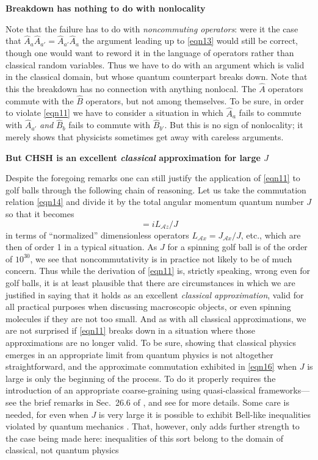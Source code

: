 \documentclass[10pt]{article} %
\def\outl#1{\par{\medskip\noindent\hspace*{.5cm}\bf
      \mathversion{bold}#1\mathversion{normal}\smallskip} }
\def\np{} \def\xa{} \def\xb{} \def\xn{} \def\xp{}
\def\outl#1{} \def\np{} \def\xa{} \def\xb{} \def\xn{} \def\xp{}
\def\outl#1{\par{\medskip\noindent\hspace*{.5cm}\bf
      \mathversion{bold}#1\mathversion{normal}\smallskip} }
\def\np{\newpage }\def\xn{\nopagebreak }\def\xp{\pagebreak }
\newcommand{\AM}{{\mathcal A}}
\begin{document}
\xb
\outl{Breakdown has nothing to do with nonlocality}
\xa


Note that the failure has to do with \emph{noncommuting operators}: were it
the case that $\hat A_a\hat A_{a'} =\hat A_{a'} \hat A_a$ the argument leading
up to \eqref{eqn13} would still be correct, though one would want to reword it
in the language of operators rather than classical random variables.  Thus we
have to do with an argument which is valid in the classical domain, but whose
quantum counterpart breaks down.  Note that this the breakdown has no
connection with anything nonlocal.  The $\hat A$ operators commute
with the $\hat B$ operators, but not among themselves.  To be sure, in order
to violate \eqref{eqn11} we have to consider a situation in which $\hat A_a$
fails to commute with $\hat A_{a'}$ \emph{and} $\hat B_b$ fails to commute
with $\hat B_{b'}$.  But this is no sign of nonlocality; it merely shows that
physicists sometimes get away with careless arguments.

\xb
\outl{But CHSH is an excellent \emph{classical} approximation for large $J$}
\xa


Despite the foregoing remarks one can still justify the application of
\eqref{eqn11} to golf balls through the following chain of reasoning. 
Let us take the commutation relation \eqref{eqn14}
and divide it by the total angular momentum
quantum number $J$ so that it becomes
\begin{equation}
  [L_{\AM x},L_{\AM y}] = i L_{\AM z}/J
\label{eqn16}
\end{equation}
in terms of ``normalized'' dimensionless operators $L_{\AM x}=J_{\AM x}/J$,
etc., which are then of order 1 in a typical situation.  As $J$ for a spinning
golf ball is of the order of $10^{30}$, we see that noncommutativity is in
practice not likely to be of much concern. Thus while the derivation of
\eqref{eqn11} is, strictly speaking, wrong even for golf balls, it is at least
plausible that there are circumstances in which we are justified in saying
that it holds as an excellent \emph{classical approximation}, valid for all
practical purposes when discussing macroscopic objects, or even spinning
molecules if they are not too small.  And as with all classical
approximations, we are not surprised if \eqref{eqn11} breaks down in a
situation where those approximations are no longer valid.  To be sure, showing
that classical physics emerges in an appropriate limit from quantum physics is
not altogether straightforward, and the approximate commutation exhibited in
\eqref{eqn16} when $J$ is large is only the beginning of the process.  To do
it properly requires the introduction of an appropriate coarse-graining using
quasi-classical frameworks---see the brief remarks in Sec.~26.6 of
\cite{Grff02c}, and see \cite{GMHr93} for more details.  Some care is needed,
for even when $J$ is very large it is possible to exhibit Bell-like
inequalities violated by quantum mechanics \cite{Mrmn80,GrMr83}.  That,
however, only adds further strength to the case being made here: inequalities
of this sort belong to the domain of classical, not quantum physics
\end{document}
